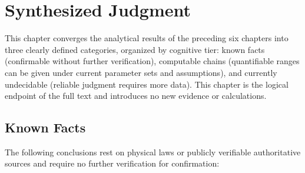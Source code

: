 
\section{Synthesized Judgment}

This chapter converges the analytical results of the preceding six chapters into three clearly defined categories, organized by cognitive tier: known facts (confirmable without further verification), computable chains (quantifiable ranges can be given under current parameter sets and assumptions), and currently undecidable (reliable judgment requires more data). This chapter is the logical endpoint of the full text and introduces no new evidence or calculations.

\subsection{Known Facts}

The following conclusions rest on physical laws or publicly verifiable authoritative sources and require no further verification for confirmation:

